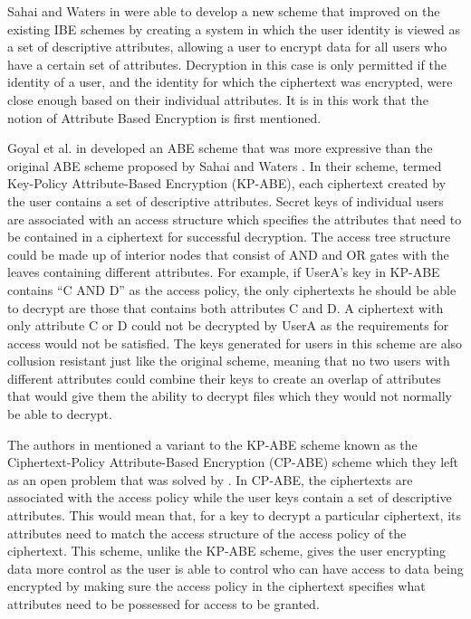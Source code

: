 Sahai and Waters in \cite{Sahai2005} were able to develop a new scheme that improved on the existing IBE schemes by creating a system in which the user identity is viewed as a set of descriptive attributes, allowing a user to encrypt data for all users who have a certain set of attributes. Decryption in this case is only permitted if the identity of a user, and the identity for which the ciphertext was encrypted, were close enough based on their individual attributes. It is in this work that the notion of Attribute Based Encryption is first mentioned.

Goyal et al. in \cite{Goyal2006} developed an ABE scheme that was more expressive than the original ABE scheme proposed by Sahai and Waters \cite{Sahai2005}. In their scheme, termed Key-Policy Attribute-Based Encryption (KP-ABE), each ciphertext created by the user contains a set of descriptive attributes. Secret keys of individual users are associated with an access structure which specifies the attributes that need to be contained in a ciphertext for successful decryption. The access tree structure could be made up of interior nodes that consist of AND and OR gates with the leaves containing different attributes. For example, if UserA’s key in KP-ABE contains “C AND D” as the access policy, the only ciphertexts he should be able to decrypt are those that contains both attributes C and D. A ciphertext with only attribute C or D could not be decrypted by UserA as the requirements for access would not be satisfied. The keys generated for users in this scheme are also collusion resistant just like the original scheme, meaning that no two users with different attributes could combine their keys to create an overlap of attributes that would give them the ability to decrypt files which they would not normally be able to decrypt.

The authors in \cite{Goyal2006} mentioned a variant to the KP-ABE scheme known as the Ciphertext-Policy Attribute-Based Encryption (CP-ABE) scheme which they left as an open problem that was solved by \cite{Bethencourt2007}. In CP-ABE, the ciphertexts are associated with the access policy while the user keys contain a set of descriptive attributes. This would mean that, for a key to decrypt a particular ciphertext, its attributes need to match the access structure of the access policy of the ciphertext. This scheme, unlike the KP-ABE scheme, gives the user encrypting data more control as the user is able to control who can have access to data being encrypted by making sure the access policy in the ciphertext specifies what attributes need to be possessed for access to be granted.

